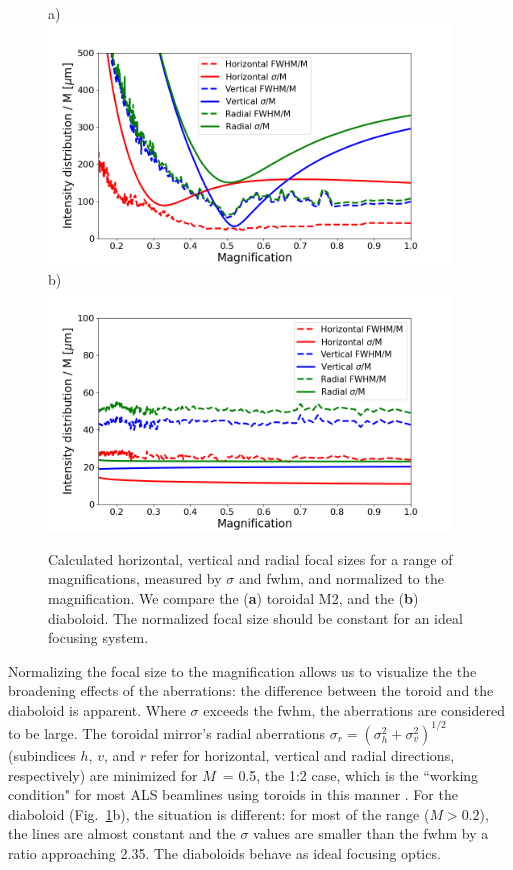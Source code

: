 \documentclass{iucr}       %
\begin{document}
\begin{figure}\label{fig:scan}
\flushleft
a)\\
\centering
\includegraphics[width=0.95\textwidth]{figures/scan_toroid.png}\\
\flushleft
b)\\
\centering
\includegraphics[width=0.95\textwidth]{figures/scan_diaboloid.png}\\
\caption{Calculated horizontal, vertical and radial focal sizes for a range of magnifications, measured by $\sigma$ and fwhm, and normalized to the magnification. We compare the (\textbf{a}) toroidal M2, and the (\textbf{b}) diaboloid. The normalized focal size should be constant for an ideal focusing system.}
\end{figure}

Normalizing the focal size to the magnification allows us to visualize the the broadening effects of the aberrations: the difference between the toroid and the diaboloid is apparent. Where $\sigma$ exceeds the fwhm, the aberrations are considered to be large. The toroidal mirror's radial aberrations $\sigma_r = (\sigma_h^2 + \sigma_v^2)^{1/2}$ (subindices $h$, $v$, and $r$ refer for horizontal, vertical and radial directions, respectively) are minimized for $M$~= 0.5, the 1:2 case, which is the ``working condition" for most ALS beamlines using toroids in this manner \cite{MacDowell2004}. For the diaboloid (Fig.~\ref{fig:scan}b), the situation is different: for most of the range ($M > 0.2$), the lines are almost constant and the $\sigma$ values are smaller than the fwhm by a ratio approaching 2.35. The diaboloids behave as ideal focusing optics.
\end{document}
